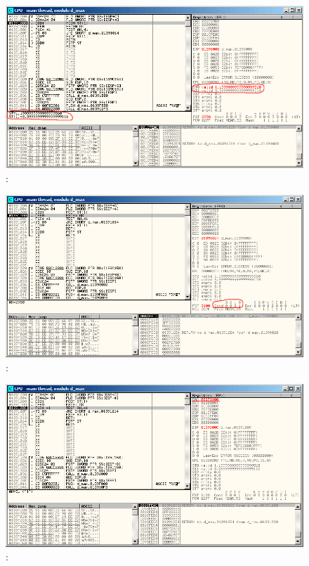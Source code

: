 \begin{figure}[H]
\centering
\includegraphics[scale=\FigScale]{patterns/12_FPU/3_comparison/x86/MSVC_Ox/olly1_1.png}
\caption{\olly: }
\label{fig:FPU_comparison_Ox_case1_olly1}
\end{figure}

\begin{figure}[H]
\centering
\includegraphics[scale=\FigScale]{patterns/12_FPU/3_comparison/x86/MSVC_Ox/olly1_2.png}
\caption{\olly: \FCOM {}}
\label{fig:FPU_comparison_Ox_case1_olly2}
\end{figure}

\begin{figure}[H]
\centering
\includegraphics[scale=\FigScale]{patterns/12_FPU/3_comparison/x86/MSVC_Ox/olly1_3.png}
\caption{\olly: \FNSTSW {}}
\label{fig:FPU_comparison_Ox_case1_olly3}
\end{figure}

